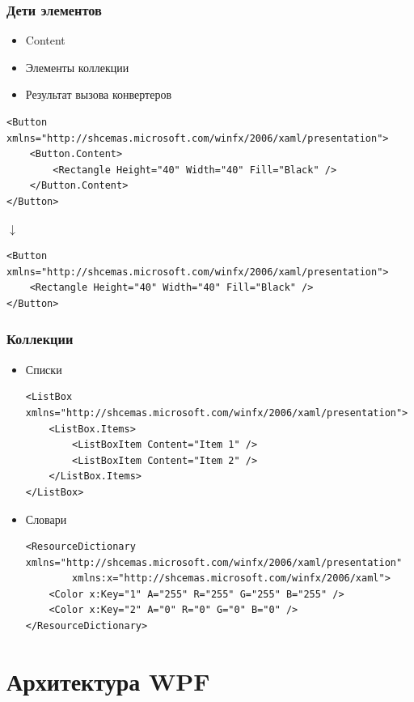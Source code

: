 \documentclass[xetex,mathserif,serif]{beamer}
\newcommand{\DownArrow} {
	\hspace{2cm}\begin{LARGE}$\downarrow$\end{LARGE}
}
\begin{document}
	\begin{frame}[fragile]
		\frametitle{Дети элементов}
		\begin{itemize}
			\item Content
			\item Элементы коллекции
			\item Результат вызова конвертеров
		\end{itemize}
		\begin{verbatim}
<Button xmlns="http://shcemas.microsoft.com/winfx/2006/xaml/presentation">
    <Button.Content>
        <Rectangle Height="40" Width="40" Fill="Black" />
    </Button.Content>
</Button>
		\end{verbatim}

		\DownArrow
		\begin{verbatim}
<Button xmlns="http://shcemas.microsoft.com/winfx/2006/xaml/presentation">
    <Rectangle Height="40" Width="40" Fill="Black" />
</Button>
		\end{verbatim}
	\end{frame}

	\begin{frame}[fragile]
		\frametitle{Коллекции}
		\begin{itemize}
			\item Списки
				\begin{verbatim}
<ListBox xmlns="http://shcemas.microsoft.com/winfx/2006/xaml/presentation">
    <ListBox.Items>
        <ListBoxItem Content="Item 1" />
        <ListBoxItem Content="Item 2" />
    </ListBox.Items>
</ListBox>
				\end{verbatim}
			\item Словари
				\begin{verbatim}
<ResourceDictionary xmlns="http://shcemas.microsoft.com/winfx/2006/xaml/presentation"
        xmlns:x="http://shcemas.microsoft.com/winfx/2006/xaml">
    <Color x:Key="1" A="255" R="255" G="255" B="255" />
    <Color x:Key="2" A="0" R="0" G="0" B="0" />
</ResourceDictionary>
				\end{verbatim}
		\end{itemize}
	\end{frame}

	\section{Архитектура WPF}
\end{document}
